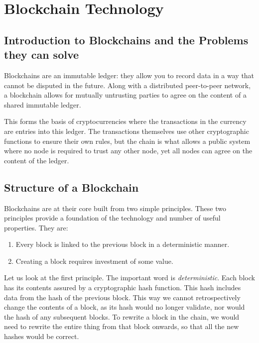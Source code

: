 
\chapter{Blockchain Technology}
\label{ch:blockchain}

\section{Introduction to Blockchains and the Problems they can solve}
\label{ch:blockchain:intro}

Blockchains are an immutable ledger: they allow you to record data in a way that cannot be disputed in the future. Along with a distributed peer-to-peer network, a blockchain allows for mutually untrusting parties to agree on the content of a shared immutable ledger.

This forms the basis of cryptocurrencies where the transactions in the currency are entries into this ledger. The transactions themselves use other cryptographic functions to ensure their own rules, but the chain is what allows a public system where no node is required to trust any other node, yet all nodes can agree on the content of the ledger.


\section{Structure of a Blockchain}
\label{ch:blockchain:structure}

Blockchains are at their core built from two simple principles. These two principles provide a foundation of the technology and number of useful properties. They are:

\begin{enumerate}
    \item Every block is linked to the previous block in a deterministic manner.
    \item Creating a block requires investment of some value.
\end{enumerate}

Let us look at the first principle. The important word is \emph{deterministic}. Each block has its contents assured by a cryptographic hash function. This hash includes data from the hash of the previous block. This way we cannot retrospectively change the contents of a block, as its hash would no longer validate, nor would the hash of any subsequent blocks. To rewrite a block in the chain, we would need to rewrite the entire thing from that block onwards, so that all the new hashes would be correct.

